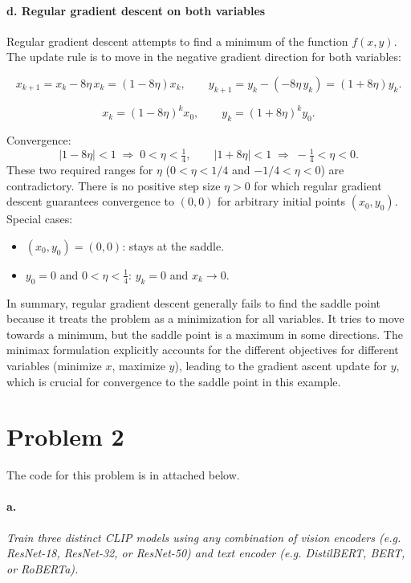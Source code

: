 \documentclass{article}
\begin{document}
\paragraph{d. Regular gradient descent on both variables}

Regular gradient descent attempts to find a minimum of the function $f(x, y)$. The update rule is to move in the negative gradient direction for both variables:

\[
x_{k+1}=x_k-8\eta\,x_k=(1-8\eta)x_k,\qquad
y_{k+1}=y_k-(-8\eta\,y_k)=(1+8\eta)y_k .
\]

\[
x_k=(1-8\eta)^k x_0,\qquad y_k=(1+8\eta)^k y_0 .
\]

Convergence:
\[
|1-8\eta|<1 \;\Longrightarrow\; 0<\eta<\tfrac14,\qquad
|1+8\eta|<1 \;\Longrightarrow\; -\tfrac14<\eta<0 .
\]
These two required ranges for $\eta$ ($0 < \eta < 1/4$ and $-1/4 < \eta < 0$) are contradictory. There is no positive step size $\eta > 0$ for which regular gradient descent guarantees convergence to $(0, 0)$ for arbitrary initial points $(x_0, y_0)$.
Special cases:
\begin{itemize}
  \item \((x_0,y_0)=(0,0)\): stays at the saddle.
  \item \(y_0=0\) and \(0<\eta<\tfrac14\): \(y_k=0\) and \(x_k\to0\).
\end{itemize}
In summary, regular gradient descent generally fails to find the saddle point because it treats the problem as a minimization for all variables. It tries to move towards a minimum, but the saddle point is a maximum in some directions. The minimax formulation explicitly accounts for the different objectives for different variables (minimize $x$, maximize $y$), leading to the gradient ascent update for $y$, which is crucial for convergence to the saddle point in this example.

\section*{Problem 2}

The code for this problem is in attached below.

\paragraph{a.} \textit{Train three distinct CLIP models using any combination of vision encoders (e.g. ResNet-18, ResNet-32, or ResNet-50) and text encoder (e.g. DistilBERT, BERT, or RoBERTa).}
\end{document}
